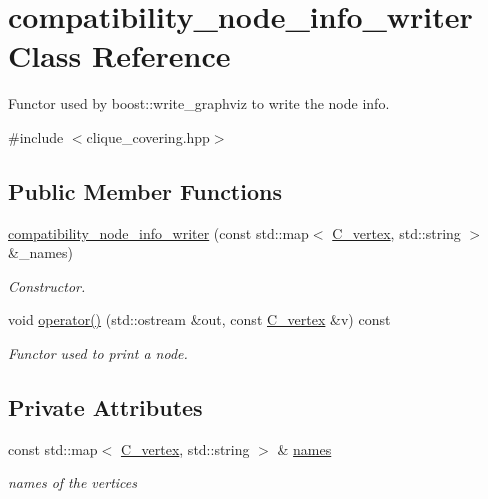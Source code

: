\hypertarget{classcompatibility__node__info__writer}{}\section{compatibility\+\_\+node\+\_\+info\+\_\+writer Class Reference}
\label{classcompatibility__node__info__writer}


Functor used by boost\+::write\+\_\+graphviz to write the node info.  




{\ttfamily \#include $<$clique\+\_\+covering.\+hpp$>$}

\subsection*{Public Member Functions}
\begin{DoxyCompactItemize}
\item 
\hyperlink{classcompatibility__node__info__writer_a794a8088e191394b66dfa93c90d28072}{compatibility\+\_\+node\+\_\+info\+\_\+writer} (const std\+::map$<$ \hyperlink{clique__covering__graph_8hpp_a9cb45047ea8c5ed95a8cfa90494345aa}{C\+\_\+vertex}, std\+::string $>$ \&\+\_\+names)
\begin{DoxyCompactList}\small\item\em Constructor. \end{DoxyCompactList}\item 
void \hyperlink{classcompatibility__node__info__writer_a5f6926af062452901bab46cd8c99d437}{operator()} (std\+::ostream \&out, const \hyperlink{clique__covering__graph_8hpp_a9cb45047ea8c5ed95a8cfa90494345aa}{C\+\_\+vertex} \&v) const
\begin{DoxyCompactList}\small\item\em Functor used to print a node. \end{DoxyCompactList}\end{DoxyCompactItemize}
\subsection*{Private Attributes}
\begin{DoxyCompactItemize}
\item 
const std\+::map$<$ \hyperlink{clique__covering__graph_8hpp_a9cb45047ea8c5ed95a8cfa90494345aa}{C\+\_\+vertex}, std\+::string $>$ \& \hyperlink{classcompatibility__node__info__writer_ace65e19901cc18536b151292dd147a5e}{names}
\begin{DoxyCompactList}\small\item\em names of the vertices \end{DoxyCompactList}\end{DoxyCompactItemize}


